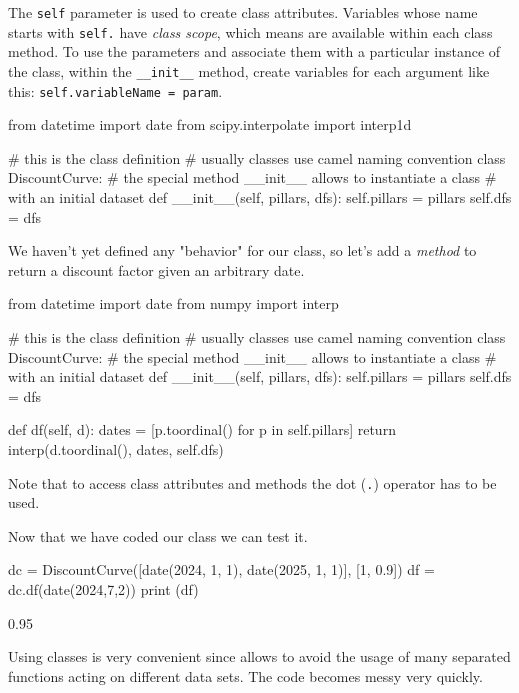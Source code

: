 \documentclass[12pt,a4paper]{book}
\begin{document}
The \texttt{self} parameter is used to create class attributes. Variables whose name starts with \texttt{self.} have \emph{class scope}, which means are available within each class method. To use the parameters and associate them with a particular instance of the class, within the \texttt{\_\_init\_\_} method, create variables for each argument like this: \texttt{self.variableName\ =\ param}.

\begin{ipython}
from datetime import date
from scipy.interpolate import interp1d

# this is the class definition
# usually classes use camel naming convention
class DiscountCurve:
    # the special method __init__ allows to instantiate a class
    # with an initial dataset
    def __init__(self, pillars, dfs):
        self.pillars = pillars
        self.dfs = dfs
\end{ipython}

We haven't yet defined any "behavior" for our class, so let's add a \emph{method} to return a discount factor given an arbitrary date.

\begin{ipython}
from datetime import date
from numpy import interp

# this is the class definition
# usually classes use camel naming convention
class DiscountCurve:
    # the special method __init__ allows to instantiate a class
    # with an initial dataset
    def __init__(self, pillars, dfs):
        self.pillars = pillars
        self.dfs = dfs

    def df(self, d):
        dates = [p.toordinal() for p in self.pillars]
        return interp(d.toordinal(), dates, self.dfs)
\end{ipython}

Note that to access class attributes and methods the dot (\texttt{.}) operator has to be used. 

Now that we have coded our class we can test it.

\begin{ipython}
dc = DiscountCurve([date(2024, 1, 1), date(2025, 1, 1)], [1, 0.9])
df = dc.df(date(2024,7,2))
print (df)
\end{ipython}
\begin{ioutput}
0.95
\end{ioutput}

Using classes is very convenient since allows to avoid the usage of many separated functions acting on different data sets. The code becomes messy very quickly.
\end{document}
